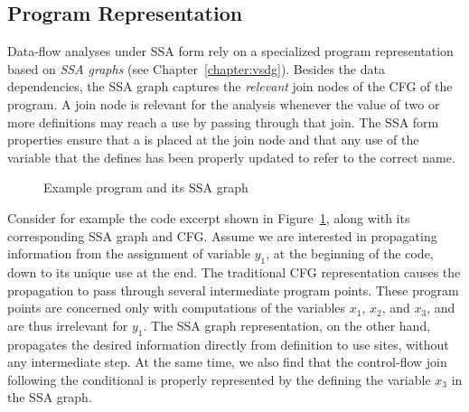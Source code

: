 \subsection{Program Representation}
Data-flow analyses under SSA form rely on a specialized program representation based on \emph{SSA graphs} (see Chapter~\ref{chapter:vsdg}). 
Besides the data dependencies, the SSA graph captures the \emph{relevant} join nodes of the CFG of the program. 
A join node is relevant for the analysis whenever the value of two or more definitions may reach a use by passing through that join. 
The SSA form properties ensure that a \phifun is placed at the join node and that any use of the variable that the \phifun defines has been properly updated to refer to the correct name.

\begin{figure}[t]
  \hfill
  \hfill
  \caption{Example program and its SSA graph}
  \label{novillo:fig:ssa_graph}
\end{figure}

Consider for example the code excerpt shown in Figure~\ref{novillo:fig:ssa_graph}, along with its corresponding SSA graph and CFG. 
Assume we are interested in propagating information from the assignment of variable $y_1$, at the beginning of the code, down to its unique use at the end. 
The traditional CFG representation causes the propagation to pass through several intermediate program points. 
These program points are concerned only with computations of the variables $x_1$, $x_2$, and $x_3$, and are thus irrelevant for $y_1$. 
The SSA graph representation, on the other hand, propagates the desired information directly from definition to use sites, without any intermediate step. 
At the same time, we also find that the control-flow join following the conditional is properly represented by the \phifun defining the variable $x_3$ in the SSA graph.


